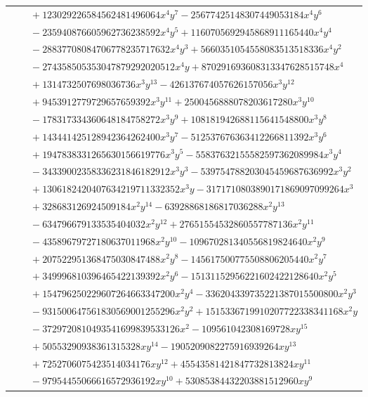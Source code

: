 \documentclass[11pt]{article}
\begin{document}
\begin{longtable}{@{}ll@{}}
 & $\quad +123029226584562481496064x^{4}y^{7}-25677425148307449053184x^{4}y^{6}$\\
 & $\quad -235940876605962736238592x^{4}y^{5}+1160705692945868911165440x^{4}y^{4}$\\
 & $\quad -28837708084706778235717632x^{4}y^{3}+5660351054558083513518336x^{4}y^{2}$\\
 & $\quad -274358505353047879292020512x^{4}y+870291693608313347628515748x^{4}$\\
 & $\quad +1314732507698036736x^{3}y^{13}-426137674057626157056x^{3}y^{12}$\\
 & $\quad +9453912779729657659392x^{3}y^{11}+2500456888078203617280x^{3}y^{10}$\\
 & $\quad -178317334360648184758272x^{3}y^{9}+108181942688115641548800x^{3}y^{8}$\\
 & $\quad +143441425128942364262400x^{3}y^{7}-512537676363412266811392x^{3}y^{6}$\\
 & $\quad +1947838331265630156619776x^{3}y^{5}-55837632155582597362089984x^{3}y^{4}$\\
 & $\quad -34339002358336231846182912x^{3}y^{3}-539754788203045459687636992x^{3}y^{2}$\\
 & $\quad +1306182420407634219711332352x^{3}y-3171710803890171869097099264x^{3}$\\
 & $\quad +328683126924509184x^{2}y^{14}-63928868186817036288x^{2}y^{13}$\\
 & $\quad -634796679133535404032x^{2}y^{12}+27651554532860557787136x^{2}y^{11}$\\
 & $\quad -43589679727180637011968x^{2}y^{10}-109670281340556819824640x^{2}y^{9}$\\
 & $\quad +207522951368475030847488x^{2}y^{8}-145617500775508806205440x^{2}y^{7}$\\
 & $\quad +349996810396465422139392x^{2}y^{6}-15131152956221602422128640x^{2}y^{5}$\\
 & $\quad +154796250229607264663347200x^{2}y^{4}-336204339735221387015500800x^{2}y^{3}$\\
 & $\quad -931500647561830569001255296x^{2}y^{2}+1515336719910207722338341168x^{2}y$\\
 & $\quad -3729720810493541699839533126x^{2}-109561042308169728xy^{15}$\\
 & $\quad +50553290938361315328xy^{14}-1905209082275916939264xy^{13}$\\
 & $\quad +7252706075423514034176xy^{12}+45543581421847732813824xy^{11}$\\
 & $\quad -97954455066616572936192xy^{10}+53085384432203881512960xy^{9}$\\

\end{longtable}
\end{document}
